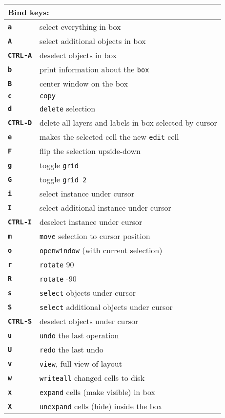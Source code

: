 \documentclass[10pt,a4paper]{article}
\newcommand{\key}[1]{\texttt{\textbf{#1}}}
\newcommand{\mac}[1]{\texttt{#1}}
\begin{document}
	\begin{tabular}{p{}p{}}
		\toprule
		\multicolumn{2}{l}{Bind keys:}\\
		\midrule
		\key{a} & select everything in box\\
		\key{A} & select additional objects in box\\
		\key{CTRL-A} & deselect objects in box\\
		\key{b} & print information about the \mac{box}\\
		\key{B} & center window on the box\\
		\key{c} & \mac{copy}\\
		\key{d} & \mac{delete} selection\\
		\key{CTRL-D} & delete all layers and labels in box selected by cursor\\
		\key{e} & makes the selected cell the new \mac{edit} cell\\
		\key{F} & flip the selection upside-down\\
		\key{g} & toggle \mac{grid}\\
		\key{G} & toggle \mac{grid 2}\\
		\key{i} & select instance under cursor\\
		\key{I} & select additional instance under cursor\\
		\key{CTRL-I} & deselect instance under cursor\\
		\key{m} & \mac{move} selection to cursor position\\
		\key{o} & \mac{openwindow} (with current selection)\\
		\key{r} & \mac{rotate} 90\\
		\key{R} & \mac{rotate} -90\\
		\key{s} & \mac{select} objects under cursor\\
		\key{S} & \mac{select} additional objects under cursor\\
		\key{CTRL-S} & deselect objects under cursor\\
		\key{u} & \mac{undo} the last operation\\
		\key{U} & \mac{redo} the last undo\\
		\key{v} & \mac{view}, full view of layout\\
		\key{w} & \mac{writeall} changed cells to disk\\
		\key{x} & \mac{expand} cells (make visible) in box\\
		\key{X} & \mac{unexpand} cells (hide) inside the box\\

\end{tabular}
\end{document}
